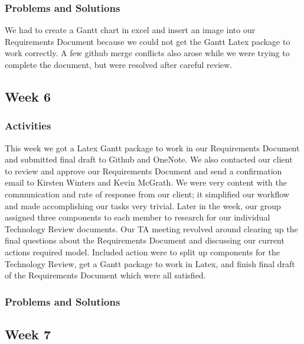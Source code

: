 \documentclass[journal,10pt,onecolumn,compsoc]{IEEEtran} \usepackage[margin=1.0in]{geometry} \usepackage{pdfpages}
\begin{document}
    \subsubsection{Problems and Solutions} 
    We had to create a Gantt chart in excel and insert an image into our Requirements Document because we could not get the Gantt Latex package to work correctly.
	A few github merge conflicts also arose while we were trying to complete the document, but were resolved after careful review.
    \subsection{Week 6}
    \subsubsection{Activities} 
    This week we got a Latex Gantt package to work in our Requirements Document and submitted final draft to Github and OneNote. We also contacted our client to review and approve our Requirements Document and send a confirmation email to Kirsten Winters and Kevin McGrath. We were very content with the communication and rate of response from our client; it simplified our workflow and made accomplishing our tasks very trivial. Later in the week, our group assigned three components to each member to research for our individual Technology Review documents.
    \noindent Our TA meeting revolved around clearing up the final questions about the Requirements Document and discussing our current actions required model. Included action were to split up components for the Technology Review, get a Gantt package to work in Latex, and finish final draft of the Requirements Document which were all satisfied.
    
    \subsubsection{Problems and Solutions} 

    \subsection{Week 7}
\end{document}
